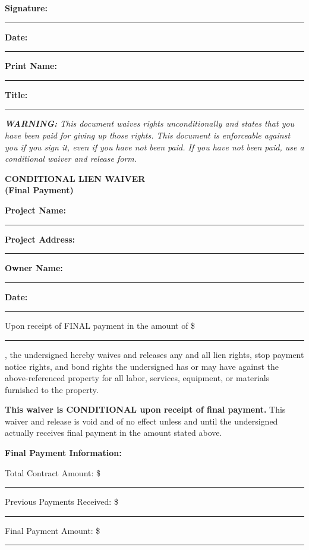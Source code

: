 \documentclass[11pt,letterpaper]{article}
\begin{document}
\textbf{Signature:} \rule{6cm}{0.4pt} \textbf{Date:} \rule{3cm}{0.4pt}

\textbf{Print Name:} \rule{6cm}{0.4pt}

\textbf{Title:} \rule{6cm}{0.4pt}

\vspace{6pt}

\textit{\textbf{WARNING:} This document waives rights unconditionally and states that you have been paid for giving up those rights. This document is enforceable against you if you sign it, even if you have not been paid. If you have not been paid, use a conditional waiver and release form.}

\newpage

\begin{center}
\textbf{\Large CONDITIONAL LIEN WAIVER}\\
\textbf{\Large (Final Payment)}
\end{center}

\vspace{12pt}

\textbf{Project Name:} \rule{9cm}{0.4pt}

\textbf{Project Address:} \rule{9cm}{0.4pt}

\textbf{Owner Name:} \rule{9cm}{0.4pt}

\textbf{Date:} \rule{4cm}{0.4pt}

\vspace{6pt}

Upon receipt of FINAL payment in the amount of \$ \rule{4cm}{0.4pt}, the undersigned hereby waives and releases any and all lien rights, stop payment notice rights, and bond rights the undersigned has or may have against the above-referenced property for all labor, services, equipment, or materials furnished to the property.

\vspace{6pt}

\textbf{This waiver is CONDITIONAL upon receipt of final payment.} This waiver and release is void and of no effect unless and until the undersigned actually receives final payment in the amount stated above.

\vspace{6pt}

\textbf{Final Payment Information:}

Total Contract Amount: \$ \rule{5cm}{0.4pt}

Previous Payments Received: \$ \rule{5cm}{0.4pt}

Final Payment Amount: \$ \rule{5cm}{0.4pt}
\end{document}
